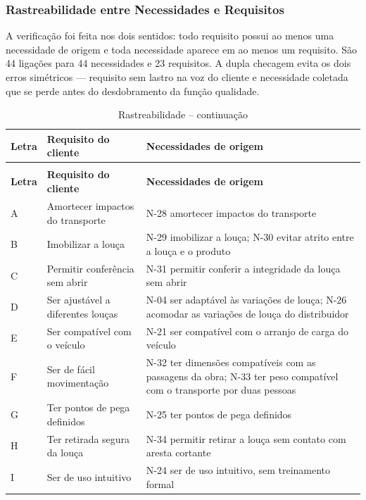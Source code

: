 \subsubsection{Rastreabilidade entre Necessidades e Requisitos}

A verificação foi feita nos dois sentidos: todo requisito possui ao menos uma necessidade de origem e toda necessidade aparece em ao menos um requisito. São 44 ligações para 44 necessidades e 23 requisitos. A dupla checagem evita os dois erros simétricos --- requisito sem lastro na voz do cliente e necessidade coletada que se perde antes do desdobramento da função qualidade.


\footnotesize
\begin{longtable}{@{}L{1.1cm}@{\hspace{0.35cm}}L{4.0cm}@{\hspace{0.35cm}}L{9.8cm}@{}}
\caption{Rastreabilidade entre requisitos e necessidades}\label{tab:rastreabilidade}\\
\toprule
\textbf{Letra} & \textbf{Requisito do cliente} & \textbf{Necessidades de origem} \\
\midrule
\endfirsthead
\caption[]{Rastreabilidade -- continuação}\\
\toprule
\textbf{Letra} & \textbf{Requisito do cliente} & \textbf{Necessidades de origem} \\
\midrule
\endhead
A & Amortecer impactos do transporte & N-28 amortecer impactos do transporte \\
B & Imobilizar a louça & N-29 imobilizar a louça; N-30 evitar atrito entre a louça e o produto \\
C & Permitir conferência sem abrir & N-31 permitir conferir a integridade da louça sem abrir \\
D & Ser ajustável a diferentes louças & N-04 ser adaptável às variações de louça; N-26 acomodar as variações de louça do distribuidor \\
E & Ser compatível com o veículo & N-21 ser compatível com o arranjo de carga do veículo \\
F & Ser de fácil movimentação & N-32 ter dimensões compatíveis com as passagens da obra; N-33 ter peso compatível com o transporte por duas pessoas \\
G & Ter pontos de pega definidos & N-25 ter pontos de pega definidos \\
H & Ter retirada segura da louça & N-34 permitir retirar a louça sem contato com aresta cortante \\
I & Ser de uso intuitivo & N-24 ser de uso intuitivo, sem treinamento formal \\

\end{longtable}
